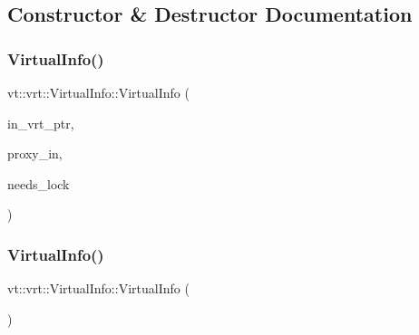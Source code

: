 \subsection{Constructor \& Destructor Documentation}
\mbox{\label{structvt_1_1vrt_1_1_virtual_info_a8c6544976bd8778afc357ee3e14b0e07}} 
\subsubsection{\texorpdfstring{Virtual\+Info()}{VirtualInfo()}\hspace{0.1cm}{\footnotesize\ttfamily [1/2]}}
{\footnotesize\ttfamily vt\+::vrt\+::\+Virtual\+Info\+::\+Virtual\+Info (\begin{DoxyParamCaption}\item[{\hyperlink{structvt_1_1vrt_1_1_virtual_info_aede28e76785423dd2685fe4cf54afa21}{Virtual\+Ptr\+Type}}]{in\+\_\+vrt\+\_\+ptr,  }\item[{\hyperlink{namespacevt_a1b417dd5d684f045bb58a0ede70045ac}{Virtual\+Proxy\+Type} const \&}]{proxy\+\_\+in,  }\item[{bool}]{needs\+\_\+lock }\end{DoxyParamCaption})}

\mbox{\label{structvt_1_1vrt_1_1_virtual_info_a783d8ff575a96a42e5f1275e0b4ea1c8}} 
\subsubsection{\texorpdfstring{Virtual\+Info()}{VirtualInfo()}\hspace{0.1cm}{\footnotesize\ttfamily [2/2]}}
{\footnotesize\ttfamily vt\+::vrt\+::\+Virtual\+Info\+::\+Virtual\+Info (\begin{DoxyParamCaption}\item[{\hyperlink{structvt_1_1vrt_1_1_virtual_info}{Virtual\+Info} const \&}]{ }\end{DoxyParamCaption})\hspace{0.3cm}{\ttfamily [delete]}}



